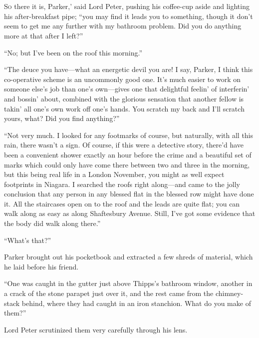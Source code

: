 \chapter[Chapter \thechapter]{}
\lettrine[lines=4,ante=‘—]{S}{o} there it is, Parker,' said Lord Peter, pushing his coffee-cup aside and lighting his after-breakfast pipe; \enquote{you may find it leads you to something, though it don’t seem to get me any further with my bathroom problem. Did you do anything more at that after I left?}

\enquote{No; but I’ve been on the roof this morning.}

\enquote{The deuce you have\allowbreak---\allowbreak what an energetic devil you are! I say, Parker, I think this co-operative scheme is an uncommonly good one. It’s much easier to work on someone else’s job than one’s own\allowbreak---\allowbreak gives one that delightful feelin’ of interferin’ and bossin’ about, combined with the glorious sensation that another fellow is takin’ all one’s own work off one’s hands. You scratch my back and I’ll scratch yours, what? Did you find anything?}

\enquote{Not very much. I looked for any footmarks of course, but naturally, with all this rain, there wasn’t a sign. Of course, if this were a detective story, there’d have been a convenient shower exactly an hour before the crime and a beautiful set of marks which could only have come there between two and three in the morning, but this being real life in a London November, you might as well expect footprints in Niagara. I searched the roofs right along\allowbreak---\allowbreak and came to the jolly conclusion that any person in any blessed flat in the blessed row might have done it. All the staircases open on to the roof and the leads are quite flat; you can walk along as easy as along Shaftesbury Avenue. Still, I’ve got some evidence that the body did walk along there.}

\enquote{What’s that?}

Parker brought out his pocketbook and extracted a few shreds of material, which he laid before his friend.

\enquote{One was caught in the gutter just above Thipps’s bathroom window, another in a crack of the stone parapet just over it, and the rest came from the chimney-stack behind, where they had caught in an iron stanchion. What do you make of them?}

Lord Peter scrutinized them very carefully through his lens.

